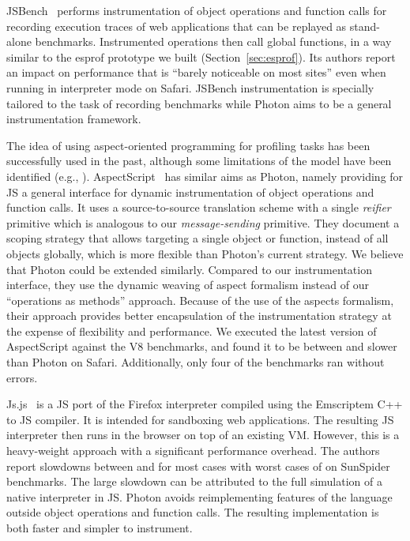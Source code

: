 JSBench~\cite{Richards:2011} performs instrumentation of object operations and
function calls for recording execution traces of web applications that can be
replayed as stand-alone benchmarks. Instrumented operations then call global
functions, in a way similar to the esprof prototype we built
(Section~\ref{sec:esprof}). Its authors report an impact on performance that is
``barely noticeable on most sites'' even when running in interpreter mode on
Safari. JSBench instrumentation is specially tailored to the task of recording
benchmarks while Photon aims to be a general instrumentation framework.

 The idea of using aspect-oriented programming for profiling tasks has
been successfully used in the past, although some limitations of the model
have been identified (e.g., \cite{BinderEtAl:CPE11}).
AspectScript~\cite{Toledo:2010} has similar aims as Photon, namely providing
for JS a general interface for dynamic instrumentation of object operations
and function calls.  It uses a source-to-source translation scheme with a
single \textit{reifier} primitive which is analogous to our
\textit{message-sending} primitive. They document a scoping strategy that
allows targeting a single object or function, instead of all objects
globally, which is more flexible than Photon's current strategy. We believe
that Photon could be extended similarly.  Compared to our instrumentation
interface, they use the dynamic weaving of aspect formalism instead of our
``operations as methods'' approach. Because of the use of the aspects
formalism, their approach provides better encapsulation of the instrumentation
strategy at the expense of flexibility and performance. We executed the latest
version of AspectScript against the V8 benchmarks, and found it to be between
 and  slower than Photon on Safari. Additionally, only
four of the benchmarks ran without errors.

Js.js~\cite{Terrace:2012} is a JS port of the Firefox interpreter
compiled using the Emscriptem C++ to JS compiler.  It is intended for sandboxing web applications. The
resulting JS interpreter then runs in the browser on top of an existing VM.
However, this is a heavy-weight approach with a significant performance overhead.
The authors report slowdowns between  and  for most cases with worst cases of
 on SunSpider benchmarks. The large slowdown can be attributed to the
full simulation of a native interpreter in JS. Photon avoids
reimplementing features of the language outside object operations and function
calls. The resulting implementation is both faster and simpler to instrument.

